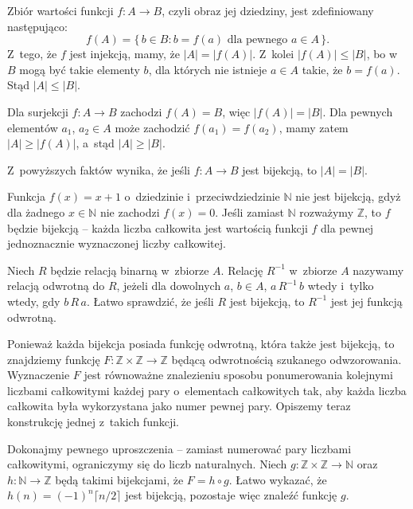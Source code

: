 
\exercise %
\subexercise
Zbiór wartości funkcji $f\colon A\to B$, czyli obraz jej dziedziny, jest zdefiniowany następująco:
\[
	f(A) = \bigl\{\,b\in B:b=f(a)\text{ dla pewnego $a\in A$}\,\bigr\}.
\]
Z~tego, że $f$ jest injekcją, mamy, że $|A|=|f(A)|$.
Z~kolei $|f(A)|\le|B|$, bo w~$B$ mogą być takie elementy $b$, dla których nie istnieje $a\in A$ takie, że $b=f(a)$.
Stąd $|A|\le|B|$.

\subexercise
Dla surjekcji $f\colon A\to B$ zachodzi $f(A)=B$, więc $|f(A)|=|B|$.
Dla pewnych elementów $a_1$, $a_2\in A$ może zachodzić $f(a_1)=f(a_2)$, mamy zatem $|A|\ge|f(A)|$, a~stąd $|A|\ge|B|$.

\bigskip
\noindent Z~powyższych faktów wynika, że jeśli $f\colon A\to B$ jest bijekcją, to $|A|=|B|$.

\exercise %
Funkcja $f(x)=x+1$ o~dziedzinie i~przeciwdziedzinie $\mathbb{N}$ nie jest bijekcją, gdyż dla żadnego $x\in\mathbb{N}$ nie zachodzi $f(x)=0$.
Jeśli zamiast $\mathbb{N}$ rozważymy $\mathbb{Z}$, to $f$ będzie bijekcją -- każda liczba całkowita jest wartością funkcji $f$ dla pewnej jednoznacznie wyznaczonej liczby całkowitej.

\exercise %
Niech $R$ będzie relacją binarną w~zbiorze $A$.
Relację $R^{-1}$ w~zbiorze $A$ nazywamy relacją odwrotną do $R$, jeżeli dla dowolnych $a$, $b\in A$, $a\,R^{-1}\,b$ wtedy i~tylko wtedy, gdy $b\,R\,a$.
Łatwo sprawdzić, że jeśli $R$ jest bijekcją, to $R^{-1}$ jest jej funkcją odwrotną.

\exercise %
Ponieważ każda bijekcja posiada funkcję odwrotną, która także jest bijekcją, to znajdziemy funkcję $F\colon\mathbb{Z}\times\mathbb{Z}\to\mathbb{Z}$ będącą odwrotnością szukanego odwzorowania.
Wyznaczenie $F$ jest równoważne znalezieniu sposobu ponumerowania kolejnymi liczbami całkowitymi każdej pary o~elementach całkowitych tak, aby każda liczba całkowita była wykorzystana jako numer pewnej pary.
Opiszemy teraz konstrukcję jednej z~takich funkcji.

Dokonajmy pewnego uproszczenia -- zamiast numerować pary liczbami całkowitymi, ograniczymy się do liczb naturalnych.
Niech $g\colon\mathbb{Z}\times\mathbb{Z}\to\mathbb{N}$ oraz $h\colon\mathbb{N}\to\mathbb{Z}$ będą takimi bijekcjami, że $F=h\circ g$.
Łatwo wykazać, że $h(n)=(-1)^n\lceil n/2\rceil$ jest bijekcją, pozostaje więc znaleźć funkcję $g$.


